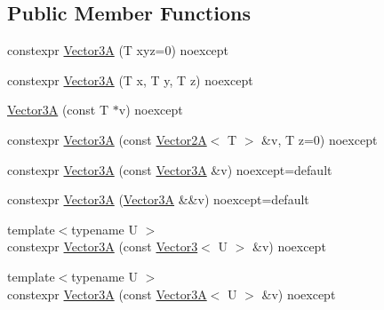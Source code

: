 \subsection*{Public Member Functions}
\begin{DoxyCompactItemize}
\item 
constexpr \hyperlink{structmage_1_1_vector3_a_3_01_t_00_01typename_01std_1_1enable__if__t_3_01std_1_1is__arithmetic__7070ab83646a86866d1e3c9d7eeea37a_a61b789ed5929859b9c28ed98eef8f2ba}{Vector3A} (T xyz=0) noexcept
\item 
constexpr \hyperlink{structmage_1_1_vector3_a_3_01_t_00_01typename_01std_1_1enable__if__t_3_01std_1_1is__arithmetic__7070ab83646a86866d1e3c9d7eeea37a_a667c279867c5dc51e45af0e7e0d52289}{Vector3A} (T x, T y, T z) noexcept
\item 
\hyperlink{structmage_1_1_vector3_a_3_01_t_00_01typename_01std_1_1enable__if__t_3_01std_1_1is__arithmetic__7070ab83646a86866d1e3c9d7eeea37a_a7e44a1f1a7008b4aa16886284659a73a}{Vector3A} (const T $\ast$v) noexcept
\item 
constexpr \hyperlink{structmage_1_1_vector3_a_3_01_t_00_01typename_01std_1_1enable__if__t_3_01std_1_1is__arithmetic__7070ab83646a86866d1e3c9d7eeea37a_a6688357d1d719a67cf3622e01f7e85b2}{Vector3A} (const \hyperlink{structmage_1_1_vector2_a}{Vector2A}$<$ T $>$ \&v, T z=0) noexcept
\item 
constexpr \hyperlink{structmage_1_1_vector3_a_3_01_t_00_01typename_01std_1_1enable__if__t_3_01std_1_1is__arithmetic__7070ab83646a86866d1e3c9d7eeea37a_aad1fe2186d352e290385dc123fd073a1}{Vector3A} (const \hyperlink{structmage_1_1_vector3_a}{Vector3A} \&v) noexcept=default
\item 
constexpr \hyperlink{structmage_1_1_vector3_a_3_01_t_00_01typename_01std_1_1enable__if__t_3_01std_1_1is__arithmetic__7070ab83646a86866d1e3c9d7eeea37a_adc6c9732fa65b928298b56423e7dc340}{Vector3A} (\hyperlink{structmage_1_1_vector3_a}{Vector3A} \&\&v) noexcept=default
\item 
{\footnotesize template$<$typename U $>$ }\\constexpr \hyperlink{structmage_1_1_vector3_a_3_01_t_00_01typename_01std_1_1enable__if__t_3_01std_1_1is__arithmetic__7070ab83646a86866d1e3c9d7eeea37a_a960edd899048bab64f1cd3acff4c5e60}{Vector3A} (const \hyperlink{structmage_1_1_vector3}{Vector3}$<$ U $>$ \&v) noexcept
\item 
{\footnotesize template$<$typename U $>$ }\\constexpr \hyperlink{structmage_1_1_vector3_a_3_01_t_00_01typename_01std_1_1enable__if__t_3_01std_1_1is__arithmetic__7070ab83646a86866d1e3c9d7eeea37a_a2ad0cd1e084d4e340c882ed67566e3eb}{Vector3A} (const \hyperlink{structmage_1_1_vector3_a}{Vector3A}$<$ U $>$ \&v) noexcept

\end{DoxyCompactItemize}
